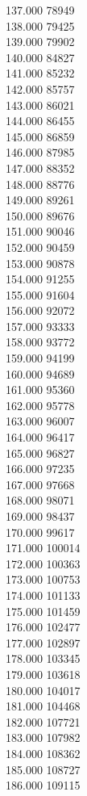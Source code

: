 { 137.000	78949 \\
 138.000	79425 \\
 139.000	79902 \\
 140.000	84827 \\
 141.000	85232 \\
 142.000	85757 \\
 143.000	86021 \\
 144.000	86455 \\
 145.000	86859 \\
 146.000	87985 \\
 147.000	88352 \\
 148.000	88776 \\
 149.000	89261 \\
 150.000	89676 \\
 151.000	90046 \\
 152.000	90459 \\
 153.000	90878 \\
 154.000	91255 \\
 155.000	91604 \\
 156.000	92072 \\
 157.000	93333 \\
 158.000	93772 \\
 159.000	94199 \\
 160.000	94689 \\
 161.000	95360 \\
 162.000	95778 \\
 163.000	96007 \\
 164.000	96417 \\
 165.000	96827 \\
 166.000	97235 \\
 167.000	97668 \\
 168.000	98071 \\
 169.000	98437 \\
 170.000	99617 \\
 171.000	100014 \\
 172.000	100363 \\
 173.000	100753 \\
 174.000	101133 \\
 175.000	101459 \\
 176.000	102477 \\
 177.000	102897 \\
 178.000	103345 \\
 179.000	103618 \\
 180.000	104017 \\
 181.000	104468 \\
 182.000	107721 \\
 183.000	107982 \\
 184.000	108362 \\
 185.000	108727 \\
 186.000	109115 \\
}
